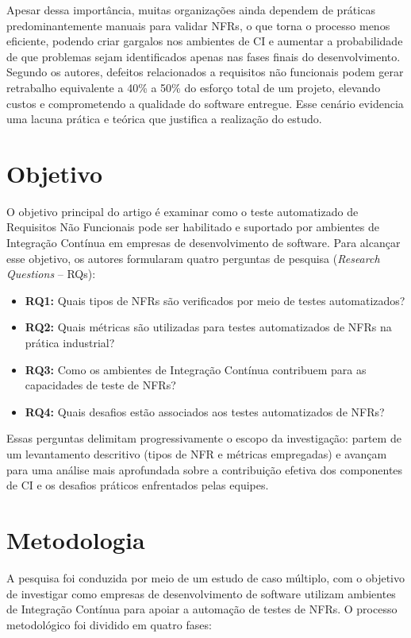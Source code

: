 \documentclass[12pt]{article}
\begin{document}
Apesar dessa importância, muitas organizações ainda dependem de práticas predominantemente manuais para validar NFRs, o que torna o processo menos eficiente, podendo criar gargalos nos ambientes de CI e aumentar a probabilidade de que problemas sejam identificados apenas nas fases finais do desenvolvimento. Segundo os autores, defeitos relacionados a requisitos não funcionais podem gerar retrabalho equivalente a 40\% a 50\% do esforço total de um projeto, elevando custos e comprometendo a qualidade do software entregue. Esse cenário evidencia uma lacuna prática e teórica que justifica a realização do estudo.

\section{Objetivo}

O objetivo principal do artigo é examinar como o teste automatizado de Requisitos Não Funcionais pode ser habilitado e suportado por ambientes de Integração Contínua em empresas de desenvolvimento de software. Para alcançar esse objetivo, os autores formularam quatro perguntas de pesquisa (\textit{Research Questions} -- RQs):

\begin{itemize}
    \item \textbf{RQ1:} Quais tipos de NFRs são verificados por meio de testes automatizados?
    \item \textbf{RQ2:} Quais métricas são utilizadas para testes automatizados de NFRs na prática industrial?
    \item \textbf{RQ3:} Como os ambientes de Integração Contínua contribuem para as capacidades de teste de NFRs?
    \item \textbf{RQ4:} Quais desafios estão associados aos testes automatizados de NFRs?
\end{itemize}

Essas perguntas delimitam progressivamente o escopo da investigação: partem de um levantamento descritivo (tipos de NFR e métricas empregadas) e avançam para uma análise mais aprofundada sobre a contribuição efetiva dos componentes de CI e os desafios práticos enfrentados pelas equipes.

\section{Metodologia}

A pesquisa foi conduzida por meio de um estudo de caso múltiplo, com o objetivo de investigar como empresas de desenvolvimento de software utilizam ambientes de Integração Contínua para apoiar a automação de testes de NFRs. O processo metodológico foi dividido em quatro fases:
\end{document}
